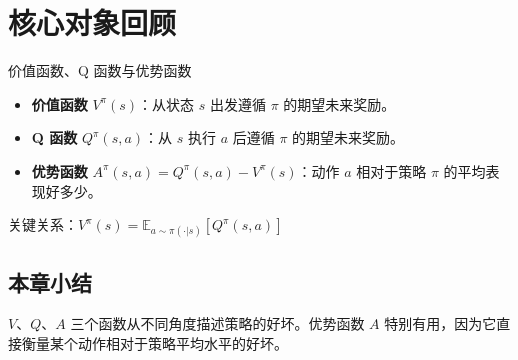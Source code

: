 \section{核心对象回顾}

\begin{importantbox}{价值函数、Q 函数与优势函数}
\begin{itemize}
    \item \textbf{价值函数} $V^\pi(s)$：从状态 $s$ 出发遵循 $\pi$ 的期望未来奖励。
    \item \textbf{Q 函数} $Q^\pi(s, a)$：从 $s$ 执行 $a$ 后遵循 $\pi$ 的期望未来奖励。
    \item \textbf{优势函数} $A^\pi(s, a) = Q^\pi(s, a) - V^\pi(s)$：动作 $a$ 相对于策略 $\pi$ 的平均表现好多少。
\end{itemize}
关键关系：$V^\pi(s) = \mathbb{E}_{a \sim \pi(\cdot|s)}\left[Q^\pi(s, a)\right]$
\end{importantbox}

\subsection{本章小结}

$V$、$Q$、$A$ 三个函数从不同角度描述策略的好坏。优势函数 $A$ 特别有用，因为它直接衡量某个动作相对于策略平均水平的好坏。


